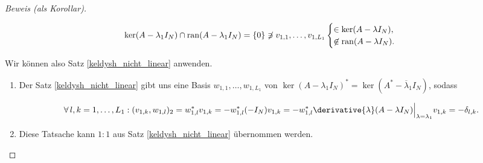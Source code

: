 \begin{proof}[Beweis (als Korollar)]
\begin{enumerate}[label = \arabic*.]
        \begin{align*}
            \ker (A - \lambda_1 I_N) \cap \operatorname{ran} (A - \lambda_1 I_N)
            =
            {\left \{ 0 \right \}}
            \not \ni
            v_{1, 1}, \dots, v_{1, L_1}
            \begin{cases}
                     \in \ker (A - \lambda I_N), \\
                \not \in \operatorname{ran} (A - \lambda I_N).
            \end{cases}
        \end{align*}
    
    \end{enumerate}

    Wir können also Satz \ref{keldysh_nicht_linear} anwenden.
    
    \begin{enumerate}[label = (\roman*), start = 2]

        \item Der Satz \ref{keldysh_nicht_linear} gibt uns eine Basis $w_{1, 1}, \dots, w_{1, L_1}$ von $\ker (A - \lambda_1 I_N)^\ast = \ker (A^\ast - \overline \lambda_1 I_N)$, sodass
        
        \begin{align*}
            \Forall l, k = 1, \dots, L_1:
                (v_{1, k}, w_{1, l})_2
                =
                w_{1, l}^\ast v_{1, k}
                =
                -w_{1, l}^\ast (-I_N) v_{1, k}
                =
                -w_{1, l}^\ast \derivative{\lambda}(A - \lambda I_N) \Big |_{\lambda = \lambda_1} v_{1, k}
                =
                -\delta_{l, k}.
        \end{align*}

        \item Diese Tatsache kann $1 : 1$ aus Satz \ref{keldysh_nicht_linear} übernommen werden.

    \end{enumerate}
    
\end{proof}
